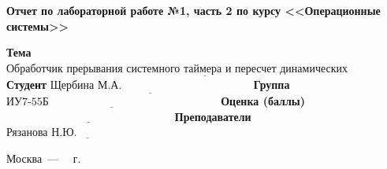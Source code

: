 \begin{titlepage}
	
	\begin{center}
		\Large\textbf{Отчет по лабораторной работе №1, часть 2 по курсу <<Операционные системы>>}
	\end{center}
	
	\noindent\textbf{Тема} $\underline{\text{Обработчик
			прерывания системного таймера и
			пересчет динамических приоритетов~~~~~~}}$\newline\newline\newline
	\noindent\textbf{Студент} $\underline{\text{Щербина М.А.~~~~~~~~~~~~~~~~~~~~~~~~~~~~~~~~~~~}}$\newline\newline
	\noindent\textbf{Группа} $\underline{\text{ИУ7-55Б~~~~~~~~~~~~~~~~~~~~~~~~~~~~~~~~~~~~~~~~~~~~~~}}$\newline\newline
	\noindent\textbf{Оценка (баллы)} $\underline{\text{~~~~~~~~~~~~~~~~~~~~~~~~~~~~~~~~~~~~~~~~~~~~~}}$\newline\newline
	\noindent\textbf{Преподаватели} $\underline{\text{Рязанова Н.Ю.~~~~~~~~~~~~~~~~~~~~~~~~~}}$\newline
	
	\begin{center}
		\vfill
		Москва~---~\the\year
		~г.
	\end{center}
 \restoregeometry
\end{titlepage}
